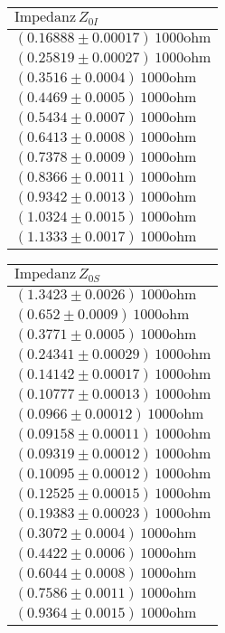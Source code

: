 \documentclass[a4paper,10pt]{scrbook}
\begin{document}
\begin{table}[htb]
\centering
\begin{tabular}{|l|}
\hline
$\text{Impedanz}\,Z_{0I}$  \\ \hline
$(0.16888\pm 0.00017)\,\mathrm{1000 ohm}$
\\ \hline
$(0.25819\pm 0.00027)\,\mathrm{1000 ohm}$
\\ \hline
$(0.3516\pm 0.0004)\,\mathrm{1000 ohm}$
\\ \hline
$(0.4469\pm 0.0005)\,\mathrm{1000 ohm}$
\\ \hline
$(0.5434\pm 0.0007)\,\mathrm{1000 ohm}$
\\ \hline
$(0.6413\pm 0.0008)\,\mathrm{1000 ohm}$
\\ \hline
$(0.7378\pm 0.0009)\,\mathrm{1000 ohm}$
\\ \hline
$(0.8366\pm 0.0011)\,\mathrm{1000 ohm}$
\\ \hline
$(0.9342\pm 0.0013)\,\mathrm{1000 ohm}$
\\ \hline
$(1.0324\pm 0.0015)\,\mathrm{1000 ohm}$
\\ \hline
$(1.1333\pm 0.0017)\,\mathrm{1000 ohm}$
\\ \hline
\end{tabular}
\end{table}
\begin{table}[htb]
\centering
\begin{tabular}{|l|}
\hline
$\text{Impedanz}\,Z_{0S}$  \\ \hline
$(1.3423\pm 0.0026)\,\mathrm{1000 ohm}$
\\ \hline
$(0.652\pm 0.0009)\,\mathrm{1000 ohm}$
\\ \hline
$(0.3771\pm 0.0005)\,\mathrm{1000 ohm}$
\\ \hline
$(0.24341\pm 0.00029)\,\mathrm{1000 ohm}$
\\ \hline
$(0.14142\pm 0.00017)\,\mathrm{1000 ohm}$
\\ \hline
$(0.10777\pm 0.00013)\,\mathrm{1000 ohm}$
\\ \hline
$(0.0966\pm 0.00012)\,\mathrm{1000 ohm}$
\\ \hline
$(0.09158\pm 0.00011)\,\mathrm{1000 ohm}$
\\ \hline
$(0.09319\pm 0.00012)\,\mathrm{1000 ohm}$
\\ \hline
$(0.10095\pm 0.00012)\,\mathrm{1000 ohm}$
\\ \hline
$(0.12525\pm 0.00015)\,\mathrm{1000 ohm}$
\\ \hline
$(0.19383\pm 0.00023)\,\mathrm{1000 ohm}$
\\ \hline
$(0.3072\pm 0.0004)\,\mathrm{1000 ohm}$
\\ \hline
$(0.4422\pm 0.0006)\,\mathrm{1000 ohm}$
\\ \hline
$(0.6044\pm 0.0008)\,\mathrm{1000 ohm}$
\\ \hline
$(0.7586\pm 0.0011)\,\mathrm{1000 ohm}$
\\ \hline
$(0.9364\pm 0.0015)\,\mathrm{1000 ohm}$
\\ \hline
\end{tabular}
\end{table}
\end{document}
